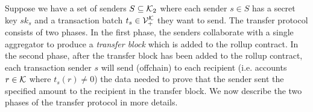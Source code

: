 Suppose we have a set of senders \(S \subseteq \mathcal{K}_2\) where each
sender \(s \in S\) has a secret key \(sk_s\) and a transaction batch
\(t_s \in \mathcal{V}_+^{\mathcal{K}}\) they want to send. The transfer protocol
consists of two phases. In the first phase, the senders collaborate
with a single aggregator to produce a \emph{transfer block} which is
added to the rollup contract. In the second phase, after the transfer
block has been added to the rollup contract, each transaction sender
\(s\) will send (offchain) to each recipient (i.e. accounts \(r \in
\mathcal{K}\) where \(t_s(r) \neq 0\)) the data needed to prove that the
sender sent the specified amount to the recipient in the transfer
block. We now describe the two phases of the transfer protocol in more details.






